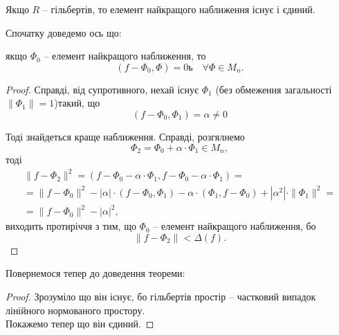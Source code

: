 \begin{theorem}
	Якщо $R$ -- гільбертів, то елемент найкращого наближення існує і єдиний.
\end{theorem}

Спочатку доведемо ось що: 
\begin{lemma}
	якщо $\Phi_0$ -- елемент найкращого наближення, то
	\begin{equation}
		\label{eq:2.8}
		(f - \Phi_0, \Phi) = 0ь \quad \forall \Phi \in M_n.
	\end{equation}
\end{lemma}

\begin{proof}
	Справді, від супротивного, нехай існує $\Phi_1$ (без обмеження загальності $\|\Phi_1\| = 1$)такий, що 
	\begin{equation}
		\label{eq:2.9}
		\left( f - \Phi_0, \Phi_1 \right) = \alpha \ne 0
	\end{equation}

	Тоді знайдеться краще наближення. Справді, розгялнемо
	\begin{equation*}
		\Phi_2 = \Phi_0 + \alpha \cdot \Phi_1 \in M_n,
	\end{equation*}
	тоді
	\begin{multline}
		\| f - \Phi_2 \|^2 = \left( f - \Phi_0 - \alpha \cdot \Phi_1, f - \Phi_0 - \alpha \cdot \Phi_1 \right) = \\ = \| f - \Phi_0 \|^2 - |\alpha| \cdot (f - \Phi_0, \Phi_1) - \alpha \cdot (\Phi_1, f - \Phi_0) + |\alpha^2| \cdot \| \Phi_1\|^2 = \\ = \| f - \Phi_0 \|^2 - |\alpha|^2,
	\end{multline}
	виходить протиріччя з тим, що $\Phi_0$ -- елемент найкращого наближення, бо
	\begin{equation}
		\label{eq:2.10}
		\| f - \Phi_2 \| < \Delta(f).
	\end{equation}
\end{proof}

Повернемося тепер до доведення теореми:

\begin{proof}
	Зрозуміло що він існує, бо гільбертів простір -- частковий випадок лінійного нормованого простору. \\

	Покажемо тепер що він єдиний.
\end{proof}

% 
